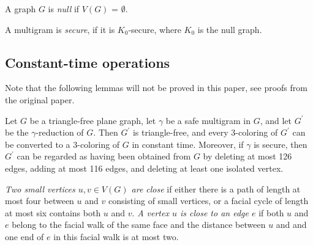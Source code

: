 \begin{definition}
A graph $G$ is \textit{null} if $V(G)$ = $\emptyset$. \cite{wu2020introduction}
\end{definition}

\begin{definition}
A multigram is \textit{secure}, if it is $K_0$-secure, where $K_0$ is the null graph. \cite{dvorak2013threecoloring}
\end{definition}

\subsection{Constant-time operations}
Note that the following lemmas will not be proved in this paper, see proofs from the original paper.
\begin{lemma}
Let $G$ be a triangle-free plane graph, let $\gamma$ be a safe multigram in $G$, and let $G^{'}$ be the $\gamma$-reduction of $G$. Then $G^{'}$ is triangle-free, and every 3-coloring of $G^{'}$ can be converted to a 3-coloring of $G$ in constant time. Moreover, if $\gamma$ is secure, then $G^{'}$ can be regarded as having been obtained from $G$ by deleting at most 126 edges, adding at most 116 edges, and deleting at least one isolated vertex.\cite{dvorak2013threecoloring}
\end{lemma}

\begin{definition}
\textit{Two small vertices $u, v \in V(G)$ are close} if either there is a path of length at most four between $u$ and $v$ consisting of small vertices, or a facial cycle of length at most six contains both $u$ and $v$. \textit{A vertex $u$ is close to an edge $e$} if both $u$ and $e$ belong to the facial walk of the same face and the distance between $u$ and and one end of $e$ in this facial walk is at most two. \cite{dvorak2013threecoloring}
\end{definition}

